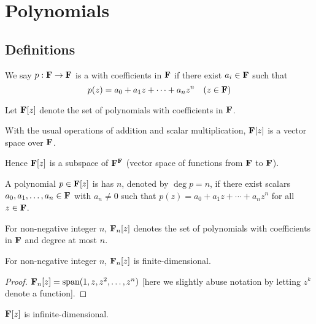 \chapter{Polynomials}\label{chap:polynomials-linearalg}
\section{Definitions}
\begin{definition}[Polynomial]
We say $p:\mathbf F\to\mathbf F$ is a  with coefficients in $\mathbf F$ if there exist $a_i\in\mathbf F$ such that
\[p(z)=a_0+a_1z+\cdots+a_nz^n\quad(z\in\mathbf F)\]
\end{definition}

\begin{notation}
Let $\mathbf F[z]$ denote the set of polynomials with coefficients in $\mathbf F$.
\end{notation}

\begin{lemma}
With the usual operations of addition and scalar multiplication, $\mathbf F[z]$ is a vector space over $\mathbf F$.

Hence $\mathbf F[z]$ is a subspace of $\mathbf F^\mathbf F$ (vector space of functions from $\mathbf F$ to $\mathbf F$).
\end{lemma}

\begin{definition}[Degree]
A polynomial $p\in\mathbf F[z]$ is has  $n$, denoted by $\deg p=n$, if there exist scalars $a_0,a_1,\dots,a_n\in\mathbf F$ with $a_n\neq0$ such that $p(z)=a_0+a_1z+\cdots+a_nz^n$ for all $z\in\mathbf F$.
\end{definition}

\begin{notation}
For non-negative integer $n$, $\mathbf F_n[z]$ denotes the set of polynomials with coefficients in $\mathbf F$ and degree at most $n$.
\end{notation}

\begin{lemma}
For non-negative integer $n$, $\mathbf F_n[z]$ is finite-dimensional.
\end{lemma}

\begin{proof}
$\mathbf F_n[z]=\operatorname{span}(1,z,z^2,\dots,z^n)$ [here we slightly abuse notation by letting $z^k$ denote a function]. 
\end{proof}

\begin{lemma}
$\mathbf F[z]$ is infinite-dimensional.
\end{lemma}

